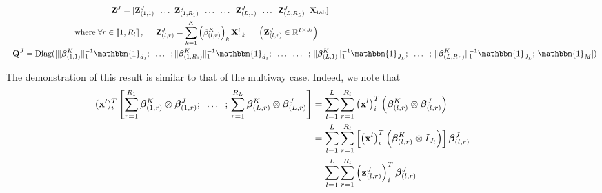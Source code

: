 \documentclass[preprint,12pt]{elsarticle}
\begin{document}
\begin{align}
    \mathbf{Z}^J = [ \mathbf{Z}_{(1,1)}^J \; \; \hdots \; \;                                                        & \mathbf{Z}_{(1,R_1)}^J  \; \; \hdots  \; \; \hdots \; \; \mathbf{Z}_{(L,1)}^J \; \; \hdots \; \; \mathbf{Z}_{(L,R_L)}^J \; \; \mathbf{X}_{\text{tab}}] \label{eqref: Z_j}                                                                                                                      \\
    \text{where} \; \forall r \in \llbracket 1, R_l\rrbracket\, , \hspace{0.5 cm} \mathbf{Z}_{(l,r)}^J                & = \sum\limits_{k = 1}^K \left(\beta_{(l,r)}^K\right)_k\mathbf{X}^l_{::k}  \hspace{0.5 cm} \left(\mathbf{Z}_{(l,r)}^J \in \mathbb{R}^{I \times J_l}\right) \label{eqref: Z_r}                                                                                                               \\
    \hspace{7 pt}
    \mathbf{Q}^J = \text{Diag}([\lVert \bm{\beta}_{(1,1)}^K \rVert_1^{-1} \mathbbm{1}_{d_1}; \; \; \hdots \; \;; \, & \lVert \bm{\beta}_{(1,R_1)}^K \rVert_1^{-1} \mathbbm{1}_{d_1};  \; \; \hdots \; \;  \hdots \; \; ;\, \lVert \bm{\beta}_{(L,1)}^K \rVert_1^{-1} \mathbbm{1}_{J_L};  \; \;  \hdots \; \; ;\, \lVert \bm{\beta}_{(L,R_L)}^K \rVert_1^{-1} \mathbbm{1}_{J_L}; \, \mathbbm{1}_M]) \label{eqref:Q^J}
\end{align}

The demonstration of this result is similar to that of the multiway case. Indeed, we note that
\begin{align}
    \hspace{-40 pt}(\mathbf{x}')_i^T \left[ \sum\limits_{r = 1}^{R_1} \bm{\beta}_{(1,r)}^K \otimes \bm{\beta}_{(1,r)}^J;   \; \; \hdots  \; \; ;\, \sum\limits_{r = 1}^{R_L} \bm{\beta}_{(L,r)}^K \otimes \bm{\beta}_{(L,r)}^J \right] & = \sum\limits_{l = 1}^L \sum\limits_{r = 1}^{R_l} \left(\mathbf{x}^l\right)_i^T \left(\bm{\beta}_{(l,r)}^K \otimes \bm{\beta}_{(l,r)}^J \right)                        \\
                                                                                                                                                                                                                                     & = \sum\limits_{l = 1}^L \sum\limits_{r = 1}^{R_l} \left[ \left(\mathbf{x}^l\right)_i^T \left( \bm{\beta}_{(l,r)}^K \otimes I_{J_l} \right) \right]\bm{\beta}_{(l,r)}^J \\
                                                                                                                                                                                                                                     & = \sum\limits_{l = 1}^L \sum\limits_{r = 1}^{R_l}\left(\mathbf{z}_{(l,r)}^J\right)_i^T \bm{\beta}_{(l,r)}^J
\end{align}
\end{document}
